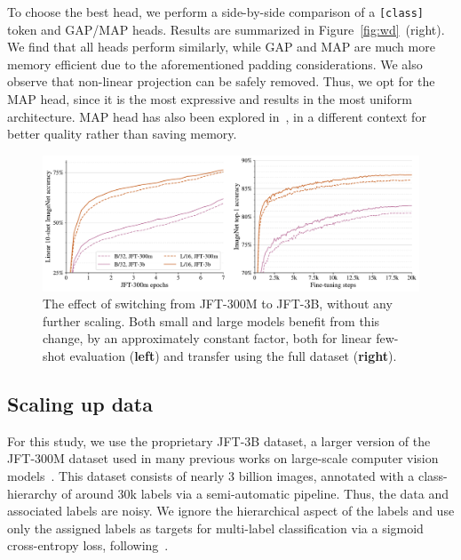 To choose the best head, we perform a side-by-side comparison of a {\tt [class]} token and GAP/MAP heads.
Results are summarized in Figure~\ref{fig:wd}~(right).
We find that all heads perform similarly, while GAP and MAP are much more memory efficient due to the aforementioned padding considerations. We also observe that non-linear projection can be safely removed.
Thus, we opt for the MAP head, since it is the most expressive and results in the most uniform architecture. 
MAP head has also been explored in~\cite{cait}, in a different context for better quality rather than saving memory. 

\begin{figure}[t]
  \begin{center}
    \includegraphics[width=0.8\linewidth]{figs/jft_300m_3b.pdf}
  \end{center}
  \vspace{-0.5em}
  \caption{The effect of switching from JFT-300M to JFT-3B, without any further scaling. Both small and large models benefit from this change, by an approximately constant factor, both for linear few-shot evaluation (\textbf{left}) and transfer using the full dataset (\textbf{right}).}
  \label{fig:jft_300m_3b}
\end{figure}


\subsection{Scaling up data}\label{sec:dataset}

For this study, we use the proprietary JFT-3B dataset, a larger version of the JFT-300M dataset used in many previous works on large-scale computer vision models~\cite{sun2017unreasonable,kolesnikov2019big,dosovitskiy2020}.
This dataset consists of nearly 3 billion images, annotated with a class-hierarchy of around 30k labels via a semi-automatic pipeline.
Thus, the data and associated labels are noisy.
We ignore the hierarchical aspect of the labels and use only the assigned labels as targets for multi-label classification via a sigmoid cross-entropy loss, following~\cite{kolesnikov2019big,dosovitskiy2020}.

